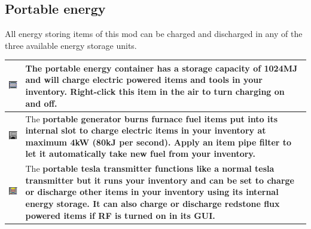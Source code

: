 \documentclass[11pt]{article} %
\makeatletter
\newcommand{\imgtex}{\begin{tabularx}{\textwidth}{@{}c@{ }X@{}}}
\makeatother
\begin{document}
\subsection{Portable energy}
All energy storing items of this mod can be charged and discharged in any of the three available energy storage units. \\
\imgtex
\includegraphics[align = t]{itemPortableEnergy} & The \bf portable energy container \rm has a storage capacity of 1024MJ and will charge electric powered items and tools in your inventory. Right-click this item in the air to turn charging on and off. \\ \hline
\includegraphics[align = t]{itemPortableGenerator} & The \bf portable generator \rm burns furnace fuel items put into its internal slot to charge electric items in your inventory at maximum 4kW (80kJ per second). Apply an item pipe filter to let it automatically take new fuel from your inventory. \\ \hline
\includegraphics[align = t]{itemTeslaTransmitter} & The \bf portable tesla transmitter \rm functions like a normal \bf tesla transmitter \rm but it runs your inventory and can be set to charge or discharge other items in your inventory using its internal energy storage. It can also charge or discharge \bf redstone flux \rm powered items if RF is turned on in its GUI.
\end{tabularx}
\end{document}
